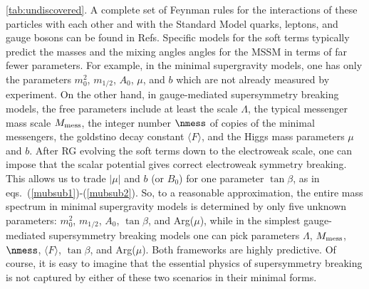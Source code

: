 \ref{tab:undiscovered}.
A complete set of Feynman rules for the interactions of these particles
with each other and with the Standard Model quarks, leptons, and gauge
bosons can be found in
Refs.\cite{HaberKanereview,GunionHaber}
Specific models for the soft terms typically predict the masses
and the mixing angles angles for the MSSM in terms of far fewer
parameters. For example, in the minimal supergravity models,
one has only the parameters $m_0^2$, $m_{1/2}$,
$A_0$, $\mu$, and $b$ which are not already measured
 by experiment. 
On the other hand, in gauge-mediated supersymmetry breaking
models, the
free
parameters include at least the scale $\Lambda$, the typical messenger
mass scale $M_{\rm mess}$, the integer number $\nmess$ of copies of
the minimal messengers, the goldstino decay constant $\langle F \rangle $,
and the Higgs mass parameters $\mu$ and $b$.
After RG evolving the soft terms down to the
electroweak scale, one can impose that the scalar potential
gives correct electroweak symmetry breaking. This allows us
to trade $|\mu|$ and $b$ (or $B_0$) for one parameter $\tan\beta$,
as in eqs.~(\ref{mubsub1})-(\ref{mubsub2}). So, to a reasonable
approximation, the entire mass spectrum in minimal supergravity
models is
determined by only five
unknown parameters:
$m_0^2$, $m_{1/2}$, $A_0$, $\tan\beta$, and Arg($\mu$), while in
the simplest gauge-mediated supersymmetry breaking models one can pick
parameters
$\Lambda$, $M_{\rm mess}$, $\nmess$, $\langle F \rangle $, $\tan\beta$,
and Arg($\mu$). 
Both frameworks are highly
predictive.
Of course, it is easy to imagine that the essential physics of
supersymmetry breaking is not captured by either of these two scenarios
in their minimal forms.

